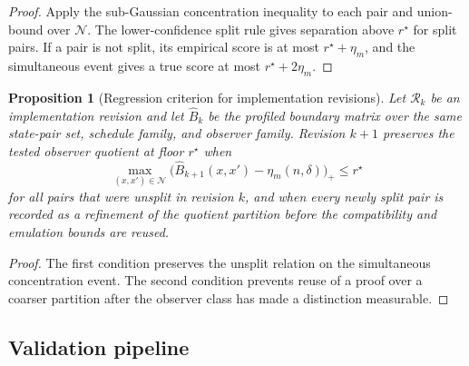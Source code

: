 \documentclass[11pt]{article}
\theoremstyle{definition}
\theoremstyle{plain}
\newtheorem{proposition}[definition]{Proposition}
\theoremstyle{remark}
\begin{document}
\begin{proof}
Apply the sub-Gaussian concentration inequality to each pair and union-bound over $\mathcal N$. The lower-confidence split rule gives separation above $r^\star$ for split pairs. If a pair is not split, its empirical score is at most $r^\star+\eta_m$, and the simultaneous event gives a true score at most $r^\star+2\eta_m$.
\end{proof}

\begin{proposition}[Regression criterion for implementation revisions]
Let $\mathcal R_k$ be an implementation revision and let $\widehat B_k$ be the profiled boundary matrix over the same state-pair set, schedule family, and observer family. Revision $k+1$ preserves the tested observer quotient at floor $r^\star$ when
\[
\max_{(x,x')\in\mathcal N}\bigl(\widehat B_{k+1}(x,x')-\eta_m(n,\delta)\bigr)_+
\le r^\star
\]
for all pairs that were unsplit in revision $k$, and when every newly split pair is recorded as a refinement of the quotient partition before the compatibility and emulation bounds are reused.
\end{proposition}

\begin{proof}
The first condition preserves the unsplit relation on the simultaneous concentration event. The second condition prevents reuse of a proof over a coarser partition after the observer class has made a distinction measurable.
\end{proof}

\subsection{Validation pipeline}
\end{document}
